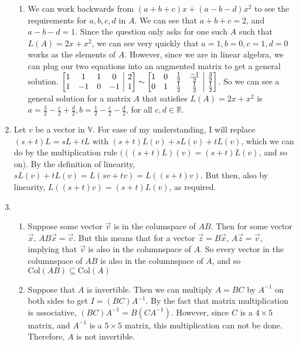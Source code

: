 \documentclass[10pt,english]{article}
\makeatletter
\newenvironment{amatrix}[1]{%
  \left[\begin{array}{@{}*{#1}{c}|c@{}}
}{%
  \end{array}\right]
}
\makeatother
\begin{document}
\begin{enumerate}
\begin{enumerate}
    \item We can work backwards from $(a+b+c)x+(a-b-d)x^2$ to see the requirements for $a,b,c,d$ in $A$. We can see that $a+b+c=2$, and $a-b-d=1$. Since the question only asks for one such $A$ such that $L(A)=2x+x^2$, we can see very quickly that $a=1,b=0,c=1,d=0$ works as the elements of $A$. However, since we are in linear algebra, we can plug our two equations into an augmented matrix to get a general solution. $\begin{amatrix}{4}1&1&1&0&2\\1&-1&0&-1&1\end{amatrix}\sim\begin{amatrix}{4}1&0&\frac{1}{2}&\frac{-1}{2}&\frac{3}{2}\\0&1&\frac{1}{2}&\frac{1}{2}&\frac{1}{2}\end{amatrix}$. So we can see a general solution for a matrix $A$ that satisfies $L(A)=2x+x^2$ is $a=\frac{3}{2}-\frac{c}{2}+\frac{d}{2}, b=\frac{1}{2}-\frac{c}{2}-\frac{d}{2}$, for all $c,d\in\mathbb{R}$. 
\end{enumerate}\pagebreak

\item Let $v$ be a vector in $\mathbb{V}$. For ease of my understanding, I will replace $(s+t)L=sL+tL$ with $(s+t)L(v)+sL(v)+tL(v)$, which we can do by the multiplication rule $(((s+t)L)(v)=(s+t)L(v)$, and so on). By the definition of linearity, $sL(v)+tL(v)=L(sv+tv)=L((s+t)v)$. But then, also by linearity, $L((s+t)v)=(s+t)L(v)$, as required.  \pagebreak
 
\item \begin{enumerate}
    \item Suppose some vector $\vec{v}$ is in the columspace of $AB$. Then for some vector $\vec{x}$, $AB\vec{x}=\vec{v}$. But this means that for a vector $\vec{z}=B\vec{x}$, $A\vec{z}=\vec{v}$, implying that $\vec{v}$ is also in the columnspace of $A$. So every vector in the columnspace of $AB$ is also in the columnspace of $A$, and so $\text{Col}(AB)\subseteq\text{Col}(A)$
    
    \item Suppose that $A$ is invertible. Then we can multiply $A=BC$ by $A^{-1}$ on both sides to get $I=(BC)A^{-1}$. By the fact that matrix multiplication is associative, $(BC)A^{-1}=B(CA^{-1})$. However, since $C$ is a $4\times5$ matrix, and $A^{-1}$ is a $5\times 5$ matrix, this multiplication can not be done. Therefore, $A$ is not invertible. 


\end{enumerate}
\end{enumerate}
\end{document}
